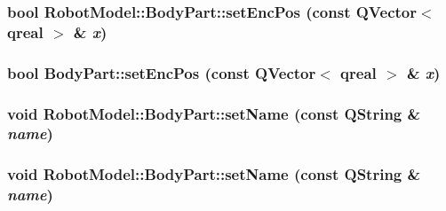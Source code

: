 \label{class_robot_model_1_1_body_part_abc2ab2a0e1da50aa7465bc1b92ed3abc}
\hypertarget{class_robot_model_1_1_body_part_aba3f72f8f042af1ef0d275a1a1593fa5}{
\subsubsection[{setEncPos}]{\setlength{\rightskip}{0pt plus 5cm}bool RobotModel::BodyPart::setEncPos (const QVector$<$ qreal $>$ \& {\em x})}}
\label{class_robot_model_1_1_body_part_aba3f72f8f042af1ef0d275a1a1593fa5}
\hypertarget{class_robot_model_1_1_body_part_adc934dcfdac5a14fe88dd5a21b9055d7}{
\subsubsection[{setEncPos}]{\setlength{\rightskip}{0pt plus 5cm}bool BodyPart::setEncPos (const QVector$<$ qreal $>$ \& {\em x})}}
\label{class_robot_model_1_1_body_part_adc934dcfdac5a14fe88dd5a21b9055d7}
\hypertarget{class_robot_model_1_1_body_part_ae67c833c817776f9b922d967a2654df2}{
\subsubsection[{setName}]{\setlength{\rightskip}{0pt plus 5cm}void RobotModel::BodyPart::setName (const QString \& {\em name})}}
\label{class_robot_model_1_1_body_part_ae67c833c817776f9b922d967a2654df2}
\hypertarget{class_robot_model_1_1_body_part_ae67c833c817776f9b922d967a2654df2}{
\subsubsection[{setName}]{\setlength{\rightskip}{0pt plus 5cm}void RobotModel::BodyPart::setName (const QString \& {\em name})}}
\label{class_robot_model_1_1_body_part_ae67c833c817776f9b922d967a2654df2}
